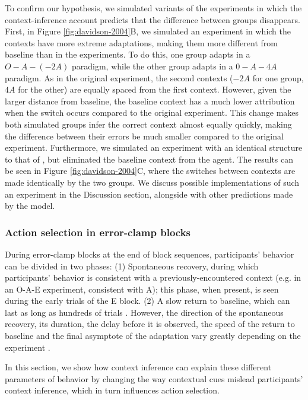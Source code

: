 \documentclass[a4paper,doc,floatsintext,natbib]{apa6}
\def \fref #1{Figure \ref{#1}}     %
\begin{document}
To confirm our hypothesis, we simulated variants of the experiments in which the context-inference account predicts that the difference between groups disappears. First, in \fref{fig:davidson-2004}B, we simulated an experiment in which the contexts have more extreme adaptations, making them more different from baseline than in the \cite{Davidson_Scaling_2004} experiments. To do this, one group adapts in a $O-A-(-2A)$ paradigm, while the other group adapts in a $0-A-4A$ paradigm. As in the original experiment, the second contexts ($-2A$ for one group, $4A$ for the other) are equally spaced from the first context. However, given the larger distance from baseline, the baseline context has a much lower attribution when the switch occurs compared to the original experiment. This change makes both simulated groups infer the correct context almost equally quickly, making the difference between their errors be much smaller compared to the original experiment. Furthermore, we simulated an experiment with an identical structure to that of \cite{Davidson_Scaling_2004}, but eliminated the baseline context from the agent. The results can be seen in \fref{fig:davidson-2004}C, where the switches between contexts are made identically by the two groups. We discuss possible implementations of such an experiment in the Discussion section, alongside with other predictions made by the model.  

\subsubsection{Action selection in error-clamp blocks}
During error-clamp blocks at the end of block sequences, participants' behavior can be divided in two phases: (1) Spontaneous recovery, during which participants' behavior is consistent with a previously-encountered context (e.g. in an O-A-E experiment, consistent with A); this phase, when present, is seen during the early trials of the E block. (2) A slow return to baseline, which can last as long as hundreds of trials \citep{Brennan_Decay_2015}. However, the direction of the spontaneous recovery, its duration, the delay before it is observed, the speed of the return to baseline and the final asymptote of the adaptation vary greatly depending on the experiment \citep{Brennan_Decay_2015,Vaswani_Decay_2013,Smith_Interacting_2006,Shmuelof_Overcoming_2012}.

In this section, we show how context inference can explain these different parameters of behavior by changing the way contextual cues mislead participants' context inference, which in turn influences action selection.
\end{document}
